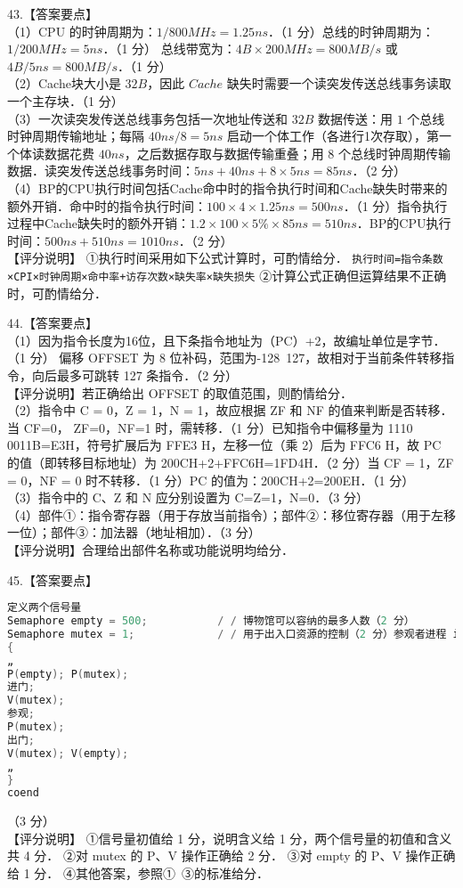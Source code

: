 43.【答案要点】 \\
（1）CPU 的时钟周期为：$1/800MHz = 1.25ns$．（1 分）总线的时钟周期为：$1/200MHz = 5ns$．（1 分） 
总线带宽为：$4B\times200MHz = 800MB/s$ 或 $4B/5ns = 800MB/s$．（1 分） \\
（2）Cache块大小是 $32B$，因此 $Cache$ 缺失时需要一个读突发传送总线事务读取一个主存块．（1 分）  \\
（3）一次读突发传送总线事务包括一次地址传送和 $32B$ 数据传送：用 $1$ 个总线时钟周期传输地址；每隔 $40ns/8 = 5ns$ 启动一个体工作（各进行1次存取），第一个体读数据花费 $40ns$，之后数据存取与数据传输重叠；用 $8$ 个总线时钟周期传输数据．读突发传送总线事务时间：$5ns + 40ns + 8\times5ns = 85ns$．（2 分） \\
（4）BP的CPU执行时间包括Cache命中时的指令执行时间和Cache缺失时带来的额外开销．命中时的指令执行时间：$100\times4\times1.25ns = 500ns$．（1 分）指令执行过程中Cache缺失时的额外开销：$1.2\times100\times5\%\times85ns = 510ns$．BP的CPU执行时间：$500ns + 510ns = 1010ns$．（2 分） \\
【评分说明】
①执行时间采用如下公式计算时，可酌情给分． \verb|执行时间=指令条数×CPI×时钟周期×命中率+访存次数×缺失率×缺失损失| 
②计算公式正确但运算结果不正确时，可酌情给分． 

44.【答案要点】 \\
（1）因为指令长度为16位，且下条指令地址为（PC）+2，故编址单位是字节．（1 分） 偏移 OFFSET 为 8 位补码，范围为-128~127，故相对于当前条件转移指令，向后最多可跳转 127 条指令．（2 分）  \\
【评分说明】若正确给出 OFFSET 的取值范围，则酌情给分．  \\
（2）指令中 C = 0，Z = 1，N = 1，故应根据 ZF 和 NF 的值来判断是否转移．当 CF=0， ZF=0，NF=1 时，需转移．（1 分）已知指令中偏移量为 1110 0011B=E3H，符号扩展后为 FFE3 H，左移一位（乘 2）后为 FFC6 H，故 PC 的值（即转移目标地址）为 200CH+2+FFC6H=1FD4H．（2 分）当 CF = 1，ZF = 0，NF = 0 时不转移．（1 分）PC 的值为：200CH+2=200EH．（1 分）  \\
（3）指令中的 C、Z 和 N 应分别设置为 C=Z=1，N=0．（3 分）  \\
（4）部件①：指令寄存器（用于存放当前指令）；部件②：移位寄存器（用于左移一位）；部件③：加法器（地址相加）．（3 分）  \\
【评分说明】合理给出部件名称或功能说明均给分．

45.【答案要点】 \\
\begin{lstlisting}[language=cpp]
定义两个信号量
Semaphore empty = 500;           / / 博物馆可以容纳的最多人数（2 分） 
Semaphore mutex = 1;             / / 用于出入口资源的控制（2 分）参观者进程 i; 
{  
„ 
P(empty); P(mutex); 
进门; 
V(mutex);
参观; 
P(mutex); 
出门; 
V(mutex); V(empty);
„ 
} 
coend
\end{lstlisting}
（3 分） \\
【评分说明】 
①信号量初值给 1 分，说明含义给 1 分，两个信号量的初值和含义共 4 分． 
②对 mutex 的 P、V 操作正确给 2 分． 
③对 empty 的 P、V 操作正确给 1 分． 
④其他答案，参照①~③的标准给分．

